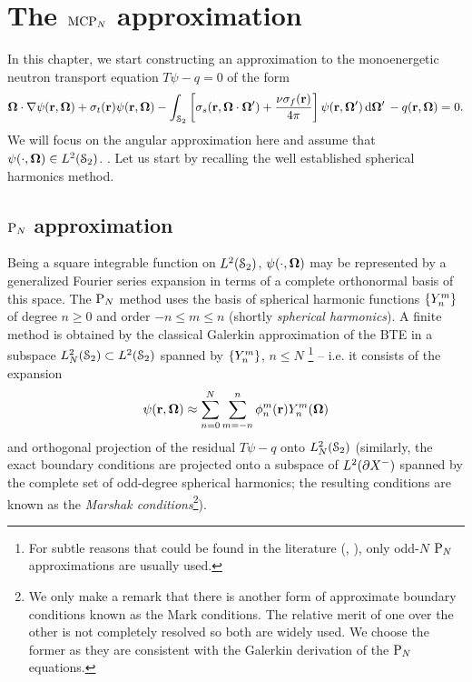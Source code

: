 \ifpdf
	\graphicspath{{4/pic/PNG/}{4/pic/PDF/}{4/pic/}}
\else
	\graphicspath{{4/pic/EPS/}{4/pic/}}
\fi

\chapter{The $\MCPN$ approximation}\label{chap:mcpn}

In this chapter, we start constructing an approximation to the monoenergetic neutron transport equation $T\psi - q = 0$
of the form
\begin{equation}\label{eq:MC-bte}
    \bomega\cdot\nabla\psi(\br,\bomega) + \sigma_t(\br)\psi(\br,\bomega) - \intA[']{\left[\sigma_s(\br,\bomega\cdot\bomega') + 
    \frac{\nu\sigma_f(\br)}{4\pi}\right]\psi(\br,\bomega')} - q(\br,\bomega) = 0.
\end{equation}
We will focus on the angular approximation here and assume that \mbox{$\psi(\cdot,\bomega)\in\Lp[2](\Sphere)$}.
. 
Let us start by recalling the well established spherical harmonics method.

\section{$\PN$ approximation}\label{sec:SPH}
Being a square integrable function on $\Lp[2](\Sphere)$, $\psi(\cdot,\bomega)$ may be represented by a generalized
Fourier series expansion in terms of a complete orthonormal basis of this space. The $\PN$ method uses the basis of
spherical harmonic functions $\{\Y{n}{m}\}$ of degree $n\geq 0$ and order $-n \leq m \leq n$ (shortly
\textit{spherical harmonics}). A finite method is obtained by the classical Galerkin approximation of the BTE in a
subspace $\Lp[2]_N(\Sphere)\subset\Lp[2](\Sphere)$ spanned by $\{\Y{n}{m}\}$,  $n \leq N$ \footnote{For subtle reasons
that could be found in the literature (\cite[Sec. 10.3.2]{Davison}, \cite[Sec. 9.6]{Stacey1}), only odd-$N$ $\PN$
approximations are usually used.} -- i.e. it consists of the expansion
\begin{equation}\label{eq:exp}
  \psi(\br,\bomega) \approx \suma[n]{0}{N}\suma[m]{-n}{n}\angmom{n}{m}(\br)\Y{n}{m}(\bomega)
\end{equation}
and orthogonal projection of the residual $T\psi - q$ onto $\Lp[2]_N(\Sphere)$ (similarly, the exact boundary conditions 
are projected onto a subspace of $\Lp[2](\pX[-])$ spanned by the complete set of odd-degree spherical harmonics; 
the resulting conditions are known as the \textit{Marshak conditions}\footnote{We only make a remark that there is 
another form of approximate boundary conditions known as the Mark conditions. The relative merit of one over the other 
is not completely resolved so both are widely used. We choose the former as they are consistent with the Galerkin 
derivation of the $\PN$ equations.}).

